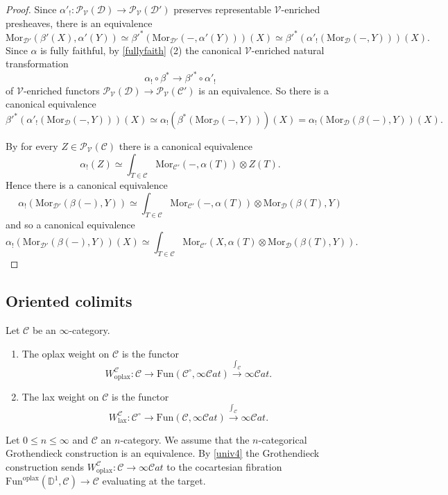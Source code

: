 \documentclass[10pt,oneside]{article}
\numberwithin{equation}{section} %
\numberwithin{figure}{section} %
\theoremstyle{plain}
\theoremstyle{definition}
\newcommand{\bD}{{\mathbb D}}
\newcommand{\mC}{{\mathcal C}}
\newcommand{\mD}{{\mathcal D}}
\newcommand{\mP}{{\mathcal P}}
\newcommand{\mV}{{\mathcal V}}
\newcommand{\W}{W}
\newcommand{\ot}{\otimes}
\newcommand{\Fun}{\mathrm{Fun}}
\newcommand{\lax}{{\mathrm{lax}}}
\newcommand{\oplax}{{\mathrm{oplax}}}
\newcommand{\Mor}{{\mathrm{Mor}}}
\newcommand{\scat}{\mathcal{C}\mathit{at}}
\begin{document}
\begin{proof}
Since $\alpha'_!: \mP_\mV(\mD) \to \mP_\mV(\mD') $ preserves representable $\mV$-enriched presheaves, there is an equivalence
$$ \Mor_{\mD'}(\beta'(X),\alpha'(Y)) \simeq \beta'^*(\Mor_{\mD'}(-,\alpha'(Y)))(X) \simeq \beta'^*(\alpha'_!(\Mor_{\mD}(-,Y)))(X). $$
Since $\alpha$ is fully faithful, by \cref{fullyfaith} (2) the canonical $\mV$-enriched natural transformation
$$ \alpha_! \circ \beta^* \to \beta'^* \circ \alpha'_! $$
of $\mV$-enriched functors $\mP_\mV(\mD) \to \mP_\mV(\mC') $ is an equivalence.
So there is a canonical equivalence
$$ \beta'^*(\alpha'_!(\Mor_{\mD}(-,Y)))(X) \simeq \alpha_!(\beta^*(\Mor_{\mD}(-,Y)))(X)= \alpha_!(\Mor_{\mD}(\beta(-),Y))(X).$$

By \cite[Theorem 4.119., Theorem 4.43.]{heine2024bienriched} for every $Z \in \mP_\mV(\mC) $ there is a canonical equivalence
$$ \alpha_!(Z) \simeq \int_{T \in \mC} \Mor_{\mC'}(-,\alpha(T)) \ot Z(T) .$$
Hence there is a canonical equivalence
$$ \alpha_!(\Mor_{\mD'}(\beta(-),Y)) \simeq \int_{T \in \mC} \Mor_{\mC'}(-,\alpha(T))\ot \Mor_{\mD}(\beta(T),Y) $$
and so a canonical equivalence
$$ \alpha_!(\Mor_{\mD'}(\beta(-),Y))(X) \simeq \int_{T \in \mC} \Mor_{\mC'}(X,\alpha(T) \ot \Mor_{\mD}(\beta(T),Y)). $$
\end{proof}

\subsection{Oriented colimits}

\begin{definition}Let $\mC$ be an $\infty$-category.
\begin{enumerate}[\normalfont(1)]\setlength{\itemsep}{-2pt}
\item The oplax weight on $\mC$ is the functor $$\W^\mC_\oplax: \mC \to \Fun(\mC^\circ, \infty\scat) \xrightarrow{\int_\mC} \infty\scat. $$

\item The lax weight on $\mC$ is the functor $$\W^\mC_\lax: \mC^{\circ} \to \Fun(\mC, \infty\scat) \xrightarrow{\int_\mC} \infty\scat.$$
\end{enumerate}

\end{definition} 

\begin{remark}\label{weigrot}
Let $0 \leq n \leq \infty$ and $\mC $ an $n$-category. We assume that the $n$-categorical Grothendieck construction is an equivalence.
By \cref{univ4} the Grothendieck construction sends 
$\W^\mC_\oplax: \mC \to \infty\scat $ to the cocartesian fibration $ \Fun^\oplax(\bD^1,\mC) \to \mC
$ evaluating at the target.
    
\end{remark}
\end{document}
